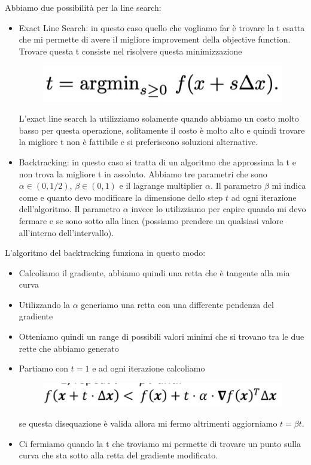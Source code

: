\documentclass[14pt]{extreport}
\begin{document}
Abbiamo due possibilità per la line search:

\begin{itemize}
	\item Exact Line Search: in questo caso quello che vogliamo far è trovare la t esatta che mi permette di avere il migliore improvement della
	      objective function. Trovare questa t consiste nel risolvere questa minimizzazione \begin{figure}[H]
		      \centering
		      \includegraphics[width=0.4\linewidth]{241.jpeg}
	      \end{figure}
	      L'exact line search la utilizziamo solamente quando abbiamo un costo molto basso per questa operazione, solitamente il costo è molto alto e
	      quindi trovare la migliore t non è fattibile e si preferiscono soluzioni alternative.
	\item Backtracking: in questo caso si tratta di un algoritmo che approssima la t e non trova la migliore t in assoluto. Abbiamo tre parametri che
	      sono $\alpha \in (0,1/2)$, $\beta \in (0,1)$ e il lagrange multiplier $\alpha$. Il parametro $\beta$ mi indica come e quanto devo modificare
	      la dimensione dello step $t$ ad ogni iterazione dell'algoritmo. Il parametro $\alpha$ invece lo utilizziamo per capire quando mi devo
	      fermare e se sono sotto alla linea (possiamo prendere un qualsiasi valore all'interno dell'intervallo).
\end{itemize}

L'algoritmo del backtracking funziona in questo modo:
\begin{itemize}
	\item Calcoliamo il gradiente, abbiamo quindi una retta che è tangente alla mia curva
	\item Utilizzando la $\alpha$ generiamo una retta con una differente pendenza del gradiente
	\item Otteniamo quindi un range di possibili valori minimi che si trovano tra le due rette che abbiamo generato
	\item Partiamo con $t=1$ e ad ogni iterazione calcoliamo \begin{figure}[H]
		      \centering
		      \includegraphics[width=0.7\linewidth]{242.jpeg}
	      \end{figure} se questa disequazione è valida allora mi fermo altrimenti aggiorniamo $t=\beta t$.
	\item Ci fermiamo quando la t che troviamo mi permette di trovare un punto sulla curva che sta sotto alla retta del gradiente modificato.
\end{itemize}
\end{document}
